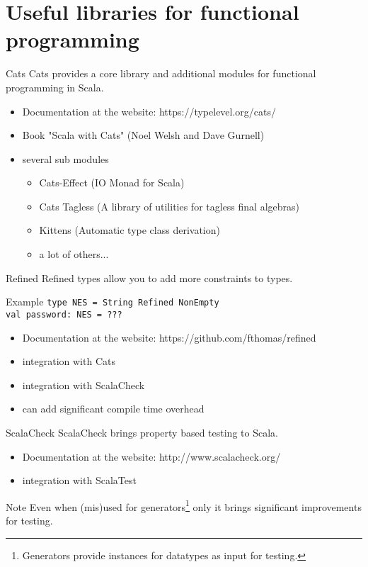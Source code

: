 \documentclass[10pt]{beamer}
\begin{document}
  \section{Useful libraries for functional programming}
  \begin{frame}{Cats}
    Cats provides a core library and additional modules for functional programming in Scala.
    \begin{itemize}
      \item Documentation at the website: https://typelevel.org/cats/
      \item Book "Scala with Cats" (Noel Welsh and Dave Gurnell)
      \item several sub modules
	\begin{itemize}
	  \item Cats-Effect (IO Monad for Scala)
	  \item Cats Tagless (A library of utilities for tagless final algebras)
	  \item Kittens (Automatic type class derivation)
	  \item a lot of others...
	\end{itemize}
    \end{itemize}
  \end{frame}

  \begin{frame}{Refined}
    Refined types allow you to add more constraints to types.
    \begin{exampleblock}{Example}
      \texttt{type NES = String Refined NonEmpty}\\
      \texttt{val password: NES = ???}
    \end{exampleblock}
    \begin{itemize}
      \item Documentation at the website: https://github.com/fthomas/refined
      \item integration with Cats
      \item integration with ScalaCheck
      \item can add significant compile time overhead
    \end{itemize}
  \end{frame}

  \begin{frame}{ScalaCheck}
    ScalaCheck brings property based testing to Scala.
    \begin{itemize}
      \item Documentation at the website: http://www.scalacheck.org/
      \item integration with ScalaTest
    \end{itemize}
    \begin{alertblock}{Note}
      Even when (mis)used for generators\footnote{Generators provide instances for datatypes as input for testing.} only it brings significant improvements for testing.
    \end{alertblock}
  \end{frame}
\end{document}
